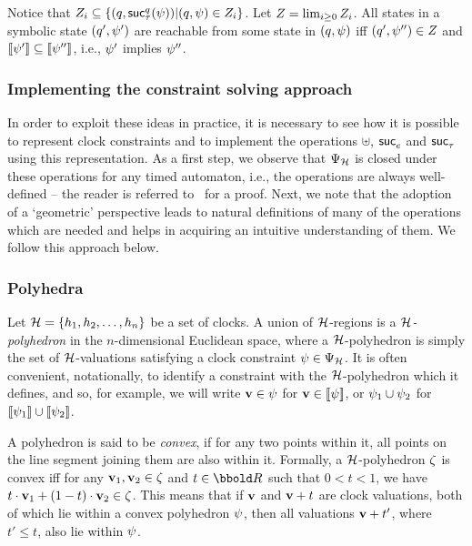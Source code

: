 {Notice that $Z_i \subseteq \{(q,\mathop{{\sf suc}_{\tau}^{q}}({\psi})) |
(q,{\psi}) \in Z_i\}$. Let $Z = \lim_{i \geq 0} Z_i$. All
states in a symbolic state $(q',{\psi}')$ are reachable from
some state in $(q,{\psi})$ iff $(q',{\psi}'') \in Z$
and ${\lbrack\!\lbrack}{\psi}'{\rbrack\!\rbrack} \subseteq {\lbrack\!\lbrack}{\psi}''{\rbrack\!\rbrack}$, i.e.,
${\psi}'$ implies ${\psi}''$.
  
\subsubsection{Implementing the constraint solving approach}
In order to exploit these ideas in practice, it is necessary to see
how it is possible to represent clock constraints and to implement the
operations $\uplus$, $\mathop{{\sf suc}_{e}^{}}$ and $\mathop{{\sf suc}_{\tau}^{}}$ using this
representation. As a first step, we observe that $\ClockConstraints$
is closed under these operations for any timed automaton, i.e., the
operations are always well-defined -- the reader is referred
to~\cite{oli:94} for a proof. Next, we note that the adoption of a
`geometric' perspective leads to natural definitions of many of the
operations which are needed and helps in acquiring an intuitive
understanding of them. We follow this approach below.

\subsubsection{Polyhedra}
Let $\clocks = \{\clock_1,\clock_2,\ldots,\clock_n\}$ be a set of
clocks.  A union of $\clocks$-regions is a \emph{$\clocks$-polyhedron}
in the $n$-dimensional Euclidean space, where a $\clocks$-polyhedron
is simply the set of $\clocks$-valuations satisfying a clock
constraint $\clkcond \in \ClockConstraints$. It is often convenient,
notationally, to identify a constraint with 
the $\clocks$-polyhedron which it defines, and so,
for example, we will write $\mathbf{v} \in {\psi}$ for 
$\mathbf{v} \in {\lbrack\!\lbrack}{\psi}{\rbrack\!\rbrack}$, or ${\psi}_1 \cup {\psi}_2$ for
${\lbrack\!\lbrack}{\psi}_1{\rbrack\!\rbrack} \cup {\lbrack\!\lbrack}{\psi}_2{\rbrack\!\rbrack}$.

A polyhedron is said to be \emph{convex}, if for any two points within
it, all points on the line segment joining them are also within it.
Formally, a $\clocks$-polyhedron ${\zeta}$ is
convex iff for any $\mathbf{v}_1,
\mathbf{v}_2 \in {\zeta}$ and $t \in \Time$ such that $0 < t < 1$, we have
$t\cdot\mathbf{v}_1 + (1 - t) \cdot \mathbf{v}_2 \in {\zeta}$. This means that
if $\mathbf{v}$ and $\mathbf{v} + t$ are clock valuations, both of which lie
within a convex polyhedron ${\psi}$, then all valuations $\mathbf{v} + t'$,
where $t' \leq t$, also lie within ${\psi}$.   

}

